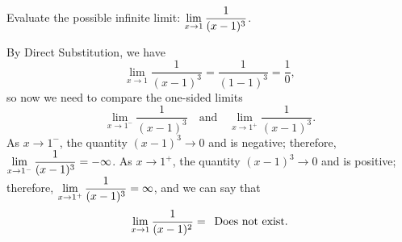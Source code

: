 \begin{example} \label{Ex:1.2.Eg1}
Evaluate the possible infinite limit:  $\displaystyle \lim_{x \to 1} \frac{1}{(x-1)^3}$.

\solution By Direct Substitution, we have
\[ \lim_{x \to 1} \frac{1}{(x-1)^3} = \frac{1}{(1-1)^3} = \frac{1}{0}, \]
so now we need to compare the one-sided limits
\[  \lim_{x \to 1^-} \frac{1}{(x-1)^3} \quad \mbox{and} \quad \lim_{x \to 1^+} \frac{1}{(x-1)^3}. \]
As $x \to 1^-$, the quantity $(x-1)^3 \to 0$ and is negative; therefore, $\displaystyle \lim_{x \to 1^-} \frac{1}{(x-1)^3} = -\infty$.  As $x \to 1^+$, the quantity $(x-1)^3 \to 0$ and is positive; therefore, $\displaystyle \lim_{x \to 1^+} \frac{1}{(x-1)^3} = \infty$, and we can say that
\[ \lim_{x \to 1} \frac{1}{(x-1)^2} = \enskip \mbox{Does not exist}. \]
\end{example}